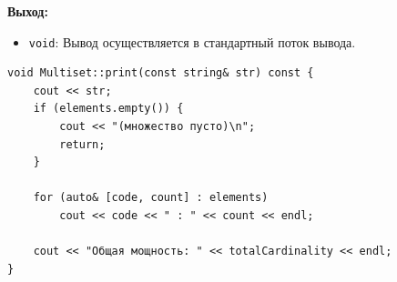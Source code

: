 \textbf{Выход:}
\begin{itemize}
    \item \texttt{void}: Вывод осуществляется в стандартный поток вывода.
\end{itemize}

\begin{lstlisting}[style=cstyle, caption={Реализация print()}]
void Multiset::print(const string& str) const {
    cout << str;
    if (elements.empty()) {
        cout << "(множество пусто)\n";
        return;
    }

    for (auto& [code, count] : elements)
        cout << code << " : " << count << endl;

    cout << "Общая мощность: " << totalCardinality << endl;
}
\end{lstlisting}
